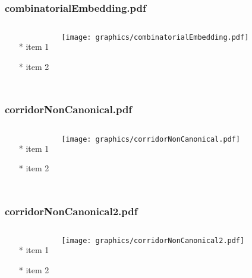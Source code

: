 \documentclass{beamer}
\begin{document}
\begin{frame} \frametitle{combinatorialEmbedding.pdf}
    \begin{columns}[c]
        \begin{itemize}
            \item[*] item 1
            \item[*] item 2
        \end{itemize}
        \begin{minipage}{\linewidth}
            \begin{center}
            \texttt{[image: graphics/combinatorialEmbedding.pdf]}
            \label{gfx:combinatorialEmbedding.pdf}
            \end{center}
        \end{minipage}
    \end{columns}
\end{frame}
\begin{frame} \frametitle{corridorNonCanonical.pdf}
    \begin{columns}[c]
        \begin{itemize}
            \item[*] item 1
            \item[*] item 2
        \end{itemize}
        \begin{minipage}{\linewidth}
            \begin{center}
            \texttt{[image: graphics/corridorNonCanonical.pdf]}
            \label{gfx:corridorNonCanonical.pdf}
            \end{center}
        \end{minipage}
    \end{columns}
\end{frame}
\begin{frame} \frametitle{corridorNonCanonical2.pdf}
    \begin{columns}[c]
        \begin{itemize}
            \item[*] item 1
            \item[*] item 2
        \end{itemize}
        \begin{minipage}{\linewidth}
            \begin{center}
            \texttt{[image: graphics/corridorNonCanonical2.pdf]}
            \label{gfx:corridorNonCanonical2.pdf}
            \end{center}
        \end{minipage}
    \end{columns}
\end{frame}
\end{document}
